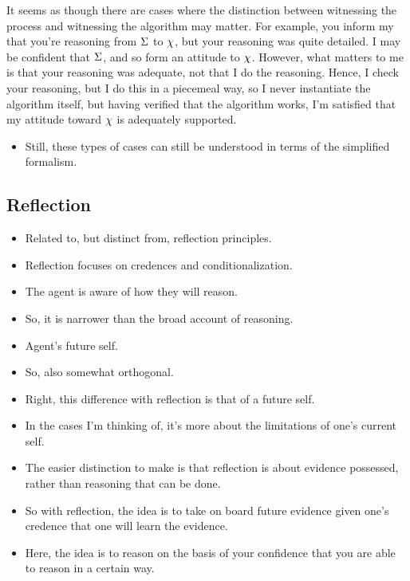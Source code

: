 \documentclass[10pt]{article}
\newcommand{\hozlinedash}[0]{%
  \noindent\hdashrule[0.5ex][c]{\textwidth}{.1pt}{2.5pt}
}
\begin{document}
\begin{note}
  It seems as though there are cases where the distinction between witnessing the process and witnessing the algorithm may matter.
  For example, you inform my that you're reasoning from \(\Sigma\) to \(\chi\), but your reasoning was quite detailed.
  I may be confident that \(\Sigma\), and so form an attitude to \(\chi\).
  However, what matters to me is that your reasoning was adequate, not that I do the reasoning.
  Hence, I check your reasoning, but I do this in a piecemeal way, so I never instantiate the algorithm itself, but having verified that the algorithm works, I'm satisfied that my attitude toward \(\chi\) is adequately supported.
  \begin{itemize}
  \item Still, these types of cases can still be understood in terms of the simplified formalism.
  \end{itemize}
\end{note}

\hozlinedash

\subsection{Reflection}
\label{sec:reflection}

\begin{itemize}
\item Related to, but distinct from, reflection principles.
\item Reflection focuses on credences and conditionalization.
\item The agent is aware of how they will reason.
\item So, it is narrower than the broad account of reasoning.
\item Agent's future self.
\item So, also somewhat orthogonal.
\end{itemize}

\begin{itemize}
\item Right, this difference with reflection is that of a future self.
\item In the cases I'm thinking of, it's more about the limitations of one's current self.
\end{itemize}

\begin{itemize}
\item The easier distinction to make is that reflection is about evidence possessed, rather than reasoning that can be done.
\item So with reflection, the idea is to take on board future evidence given one's credence that one will learn the evidence.
\item Here, the idea is to reason on the basis of your confidence that you are able to reason in a certain way.
\end{itemize}
\end{document}
